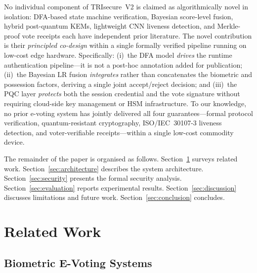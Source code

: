 \documentclass[pdflatex,sn-mathphys-num]{sn-jnl}%
\theoremstyle{thmstyleone}%
\theoremstyle{thmstyletwo}%
\theoremstyle{thmstylethree}%
\begin{document}
No individual component of TRIsecure~V2 is claimed as algorithmically novel in
isolation: DFA-based state machine verification, Bayesian score-level fusion,
hybrid post-quantum KEMs, lightweight CNN liveness detection, and Merkle-proof
vote receipts each have independent prior literature. The novel contribution is
their \emph{principled co-design} within a single formally verified pipeline
running on low-cost edge hardware. Specifically: (i)~the DFA model
\emph{drives} the runtime authentication pipeline—it is not a post-hoc
annotation added for publication; (ii)~the Bayesian LR fusion \emph{integrates}
rather than concatenates the biometric and possession factors, deriving a single
joint accept/reject decision; and (iii)~the PQC layer \emph{protects} both the
session credential and the vote signature without requiring cloud-side key
management or HSM infrastructure. To our knowledge, no prior e-voting system
has jointly delivered all four guarantees—formal protocol verification,
quantum-resistant cryptography, ISO/IEC~30107-3 liveness detection, and
voter-verifiable receipts—within a single low-cost commodity device.

The remainder of the paper is organised as follows. Section~\ref{sec:related}
surveys related work. Section~\ref{sec:architecture} describes the system
architecture. Section~\ref{sec:security} presents the formal security analysis.
Section~\ref{sec:evaluation} reports experimental results.
Section~\ref{sec:discussion} discusses limitations and future work.
Section~\ref{sec:conclusion} concludes.

\section{Related Work}\label{sec:related}

\subsection{Biometric E-Voting Systems}
\end{document}
